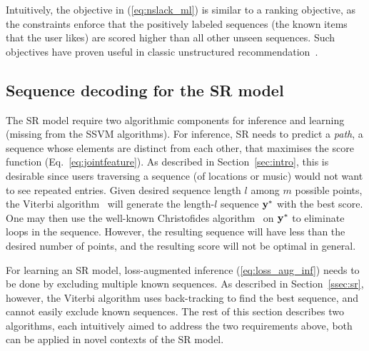 Intuitively, the objective in (\ref{eq:nslack_ml}) is similar to a ranking objective, as the constraints enforce
that the positively labeled sequences (the known items that the user likes) are scored
higher than all other unseen sequences.
Such objectives have proven useful in classic unstructured recommendation~\cite{bpr09}.



\subsection{Sequence decoding for the SR model}
\label{ssec:subtour}

The SR model require two algorithmic components for inference and learning
(missing from the SSVM algorithms).
For inference, SR needs to predict a {\em path}, \ie a sequence whose elements are distinct from each other,
that maximises the score function (Eq.~\ref{eq:jointfeature}).
As described in Section~\ref{sec:intro}, this is desirable since users traversing a sequence (of locations or music)
would not want to see repeated entries.
Given desired sequence length $l$ among $m$ possible points, the Viterbi algorithm~\cite{tsochantaridis2005large}
will generate the length-$l$ sequence $\mathbf{y}^*$ with the best score. %
One may then use the well-known
Christofides algorithm~\cite{christofides1976} on $\mathbf{y}^*$ to eliminate loops in the sequence.
However, the resulting sequence will have less than the desired number of points, and the resulting score will not be optimal in general.

For learning an SR model, loss-augmented inference (\ref{eq:loss_aug_inf}) needs to be done by excluding multiple known sequences.
As described in Section~\ref{ssec:sr}, %
however, the Viterbi algorithm uses back-tracking to find the best sequence,
and cannot easily exclude known sequences.
The rest of this section describes two algorithms, each intuitively aimed to address %
the two requirements above, both can be applied in novel contexts of the SR model.


